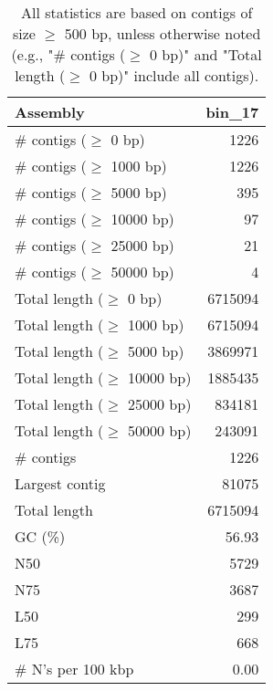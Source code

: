 \documentclass[12pt,a4paper]{article}
\begin{document}
\begin{table}[ht]
\begin{center}
\caption{All statistics are based on contigs of size $\geq$ 500 bp, unless otherwise noted (e.g., "\# contigs ($\geq$ 0 bp)" and "Total length ($\geq$ 0 bp)" include all contigs).}
\begin{tabular}{|l*{1}{|r}|}
\hline
Assembly & bin\_17 \\ \hline
\# contigs ($\geq$ 0 bp) & 1226 \\ \hline
\# contigs ($\geq$ 1000 bp) & 1226 \\ \hline
\# contigs ($\geq$ 5000 bp) & 395 \\ \hline
\# contigs ($\geq$ 10000 bp) & 97 \\ \hline
\# contigs ($\geq$ 25000 bp) & 21 \\ \hline
\# contigs ($\geq$ 50000 bp) & 4 \\ \hline
Total length ($\geq$ 0 bp) & 6715094 \\ \hline
Total length ($\geq$ 1000 bp) & 6715094 \\ \hline
Total length ($\geq$ 5000 bp) & 3869971 \\ \hline
Total length ($\geq$ 10000 bp) & 1885435 \\ \hline
Total length ($\geq$ 25000 bp) & 834181 \\ \hline
Total length ($\geq$ 50000 bp) & 243091 \\ \hline
\# contigs & 1226 \\ \hline
Largest contig & 81075 \\ \hline
Total length & 6715094 \\ \hline
GC (\%) & 56.93 \\ \hline
N50 & 5729 \\ \hline
N75 & 3687 \\ \hline
L50 & 299 \\ \hline
L75 & 668 \\ \hline
\# N's per 100 kbp & 0.00 \\ \hline
\end{tabular}
\end{center}
\end{table}
\end{document}
